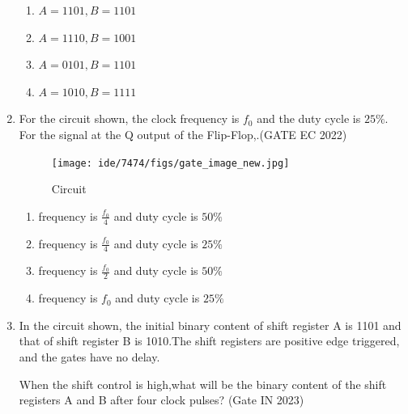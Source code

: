 \begin{enumerate}
\begin{enumerate}
\item $A= 1101,B=1101$
\item $A=1110 ,B=1001$
\item $A=0101 ,B=1101$
\item $A=1010 ,B=1111$
\end {enumerate}
\item For the circuit shown, the clock frequency is $f_0$ and the duty cycle is $25\%$. For the signal at the Q output of the Flip-Flop,\underline{\hspace{20pt}}.\hfill(GATE EC 2022)
		\begin{figure}[h]
			\centering
			\texttt{[image: ide/7474/figs/gate\_image\_new.jpg]}
			\caption{Circuit}
			\label{fig:new_gate}
		\end{figure}
			\begin{enumerate}
			\item frequency is $\frac{{f_0}}{4}$ and duty cycle is $50\%$
			\item frequency is $\frac{{f_0}}{4}$ and duty cycle is $25\%$
			\item frequency is $\frac{{f_0}}{2}$ and duty cycle is $50\%$
			\item frequency is ${f_0}$ and duty cycle is $25\%$
		\end{enumerate}
\item In the circuit shown, the initial binary content of shift register A is 1101 and that of shift register B is 1010.The shift registers are positive edge triggered, and the gates have no delay.

When the shift control is high,what will be the binary content of the shift registers A and B after four clock pulses?
\hfill{(Gate IN 2023)}


\end{enumerate}
